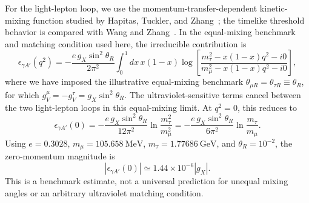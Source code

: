 \documentclass[12pt,a4paper]{article}
\begin{document}
For the light-lepton loop, we use the momentum-transfer-dependent kinetic-mixing function studied by Hapitas, Tuckler, and Zhang~\cite{Hapitas:2021kineticMixing}; the timelike threshold behavior is compared with Wang and Zhang~\cite{Wang:2026supernova}. In the equal-mixing benchmark and matching condition used here, the irreducible contribution is
\[
\epsilon_{\gamma A'}(q^2)=
-\frac{e\,g_X\sin^2\theta_R}{2\pi^2}
\int_0^1 dx\,x(1-x)
\log\!\left[
\frac{m_\tau^2-x(1-x)q^2-i0}
     {m_\mu^2-x(1-x)q^2-i0}
\right],
\]
where we have imposed the illustrative equal-mixing benchmark
\(\theta_{\mu R}=\theta_{\tau R}\equiv\theta_R\), for which
\(g_V^\mu=-g_V^\tau=g_X\sin^2\theta_R\). The ultraviolet-sensitive terms cancel between the two light-lepton loops in this equal-mixing limit. At \(q^2=0\), this reduces to
\[
\epsilon_{\gamma A'}(0)=
-\frac{e\,g_X\sin^2\theta_R}{12\pi^2}
\ln\frac{m_\tau^2}{m_\mu^2}
=-\frac{e\,g_X\sin^2\theta_R}{6\pi^2}
\ln\frac{m_\tau}{m_\mu}.
\]
Using \(e=0.3028\), \(m_\mu=105.658~\mathrm{MeV}\), \(m_\tau=1.77686~\mathrm{GeV}\), and \(\theta_R=10^{-2}\), the zero-momentum magnitude is
\[
|\epsilon_{\gamma A'}(0)|\simeq1.44\times10^{-6}|g_X|.
\]
This is a benchmark estimate, not a universal prediction for unequal mixing angles or an arbitrary ultraviolet matching condition.
\end{document}
